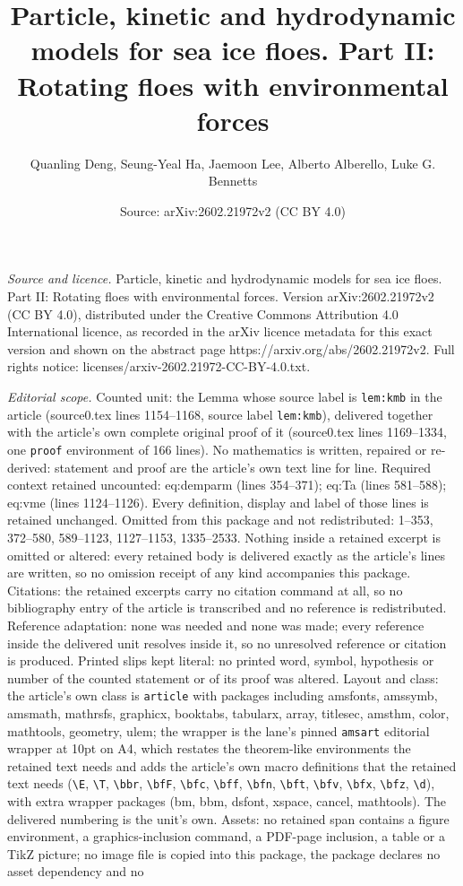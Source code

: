 \documentclass[10pt,a4paper]{amsart}
\title[Particle, kinetic and hydrodynamic models for sea ice floes.]{Particle, kinetic and hydrodynamic models for sea ice floes. Part II: Rotating floes with environmental forces}
\author{Quanling Deng, Seung-Yeal Ha, Jaemoon Lee, Alberto Alberello, Luke G. Bennetts}
\date{Source: arXiv:2602.21972v2 (CC BY 4.0)}
\begin{document}
\maketitle

\noindent\emph{Source and licence.} Particle, kinetic and hydrodynamic models for sea ice floes. Part II: Rotating floes with environmental forces. Version arXiv:2602.21972v2 (CC BY 4.0), distributed under the Creative Commons Attribution 4.0 International licence, as recorded in the arXiv licence metadata for this exact version and shown on the abstract page https://arxiv.org/abs/2602.21972v2. Full rights notice: licenses/arxiv-2602.21972-CC-BY-4.0.txt.\par\smallskip

\noindent\textit{Editorial scope.} Counted unit: the Lemma whose source label is \texttt{lem:kmb} in the article (source0.tex lines 1154--1168, source label \texttt{lem:kmb}), delivered together with the article's own complete original proof of it (source0.tex lines 1169--1334, one \texttt{proof} environment of 166 lines). No mathematics is written, repaired or re-derived: statement and proof are the article's own text line for line. Required context retained uncounted: eq:demparm (lines 354--371); eq:Ta (lines 581--588); eq:vme (lines 1124--1126). Every definition, display and label of those lines is retained unchanged. Omitted from this package and not redistributed: 1--353, 372--580, 589--1123, 1127--1153, 1335--2533. Nothing inside a retained excerpt is omitted or altered: every retained body is delivered exactly as the article's lines are written, so no omission receipt of any kind accompanies this package. Citations: the retained excerpts carry no citation command at all, so no bibliography entry of the article is transcribed and no reference is redistributed. Reference adaptation: none was needed and none was made; every reference inside the delivered unit resolves inside it, so no unresolved reference or citation is produced. Printed slips kept literal: no printed word, symbol, hypothesis or number of the counted statement or of its proof was altered. Layout and class: the article's own class is \texttt{article} with packages including amsfonts, amssymb, amsmath, mathrsfs, graphicx, booktabs, tabularx, array, titlesec, amsthm, color, mathtools, geometry, ulem; the wrapper is the lane's pinned \texttt{amsart} editorial wrapper at 10pt on A4, which restates the theorem-like environments the retained text needs and adds the article's own macro definitions that the retained text needs (\texttt{\textbackslash E}, \texttt{\textbackslash T}, \texttt{\textbackslash bbr}, \texttt{\textbackslash bfF}, \texttt{\textbackslash bfc}, \texttt{\textbackslash bff}, \texttt{\textbackslash bfn}, \texttt{\textbackslash bft}, \texttt{\textbackslash bfv}, \texttt{\textbackslash bfx}, \texttt{\textbackslash bfz}, \texttt{\textbackslash d}), with extra wrapper packages (bm, bbm, dsfont, xspace, cancel, mathtools). The delivered numbering is the unit's own. Assets: no retained span contains a figure environment, a graphics-inclusion command, a PDF-page inclusion, a table or a TikZ picture; no image file is copied into this package, the package declares no asset dependency and no 
\end{document}
